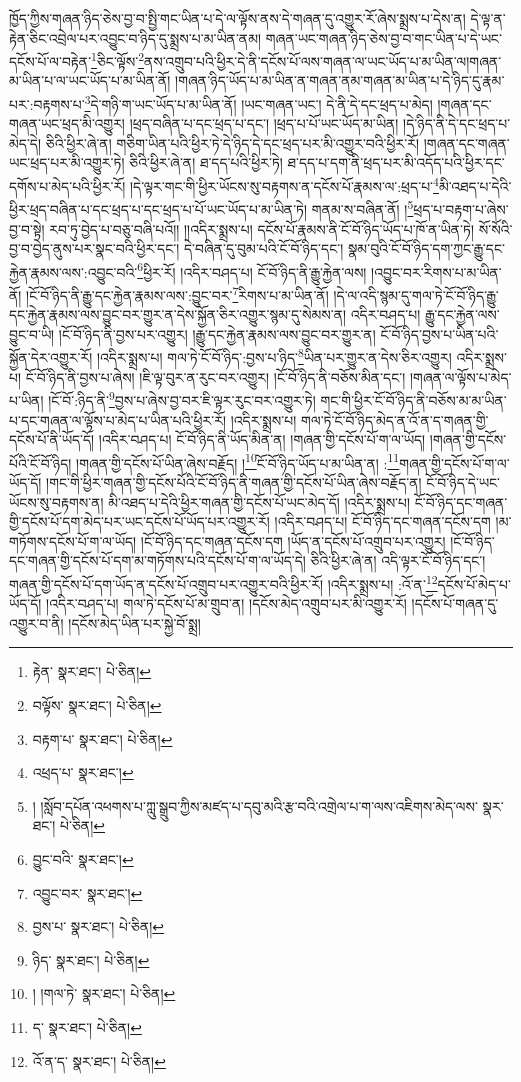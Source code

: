 ཁྱོད་ཀྱིས་གཞན་ཉིད་ཅེས་བྱ་བ་སྤྱི་གང་ཡིན་པ་དེ་ལ་ལྟོས་ནས་དེ་གཞན་དུ་འགྱུར་རོ་ཞེས་སྨྲས་པ་དེས་ན། དེ་ལྟ་ན་རྟེན་ཅིང་འབྲེལ་པར་འབྱུང་བ་ཉིད་དུ་སྨྲས་པ་མ་ཡིན་ནམ། གཞན་ཡང་གཞན་ཉིད་ཅེས་བྱ་བ་གང་ཡིན་པ་དེ་ཡང་དངོས་པོ་ལ་བརྟེན་\footnote{རྟེན་  སྣར་ཐང་།  པེ་ཅིན། }ཅིང་ལྟོས་\footnote{བལྟོས་  སྣར་ཐང་།  པེ་ཅིན། }ནས་འགྲུབ་པའི་ཕྱིར་དེ་ནི་དངོས་པོ་ལས་གཞན་ལ་ཡང་ཡོད་པ་མ་ཡིན་ལ།གཞན་མ་ཡིན་པ་ལ་ཡང་ཡོད་པ་མ་ཡིན་ནོ། །གཞན་ཉིད་ཡོད་པ་མ་ཡིན་ན་གཞན་ནམ་གཞན་མ་ཡིན་པ་དེ་ཉིད་དུ་རྣམ་པར་:བརྟགས་པ་\footnote{བརྟག་པ་  སྣར་ཐང་།  པེ་ཅིན། }དེ་གཉི་ག་ཡང་ཡོད་པ་མ་ཡིན་ནོ། །ཡང་གཞན་ཡང་། དེ་ནི་དེ་དང་ཕྲད་པ་མེད། །གཞན་དང་གཞན་ཡང་ཕྲད་མི་འགྱུར། །ཕྲད་བཞིན་པ་དང་ཕྲད་པ་དང་། །ཕྲད་པ་པོ་ཡང་ཡོད་མ་ཡིན། །དེ་ཉིད་ནི་དེ་དང་ཕྲད་པ་མེད་དེ། ཅིའི་ཕྱིར་ཞེ་ན། གཅིག་ཡིན་པའི་ཕྱིར་ཏེ་དེ་ཉིད་དེ་དང་ཕྲད་པར་མི་འགྱུར་བའི་ཕྱིར་རོ། །གཞན་དང་གཞན་ཡང་ཕྲད་པར་མི་འགྱུར་ཏེ། ཅིའི་ཕྱིར་ཞེ་ན། ཐ་དད་པའི་ཕྱིར་ཏེ། ཐ་དད་པ་དག་ནི་ཕྲད་པར་མི་འདོད་པའི་ཕྱིར་དང་དགོས་པ་མེད་པའི་ཕྱིར་རོ། །དེ་ལྟར་གང་གི་ཕྱིར་ཡོངས་སུ་བརྟགས་ན་དངོས་པོ་རྣམས་ལ་:ཕྲད་པ་\footnote{འཕྲད་པ་  སྣར་ཐང་། }མི་འཐད་པ་དེའི་ཕྱིར་ཕྲད་བཞིན་པ་དང་ཕྲད་པ་དང་ཕྲད་པ་པོ་ཡང་ཡོད་པ་མ་ཡིན་ཏེ། གནམ་ས་བཞིན་ནོ། །\footnote{། །སློབ་དཔོན་འཕགས་པ་ཀླུ་སྒྲུབ་ཀྱིས་མཛད་པ་དབུ་མའི་རྩ་བའི་འགྲེལ་པ་ག་ལས་འཇིགས་མེད་ལས་  སྣར་ཐང་།  པེ་ཅིན། }ཕྲད་པ་བརྟག་པ་ཞེས་བྱ་བ་སྟེ། རབ་ཏུ་བྱེད་པ་བཅུ་བཞི་པའོ།། །།འདིར་སྨྲས་པ། དངོས་པོ་རྣམས་ནི་ངོ་བོ་ཉིད་ཡོད་པ་ཁོ་ན་ཡིན་ཏེ། སོ་སོའི་བྱ་བ་བྱེད་ནུས་པར་སྣང་བའི་ཕྱིར་དང་། དེ་བཞིན་དུ་བུམ་པའི་ངོ་བོ་ཉིད་དང་། སྣམ་བུའི་ངོ་བོ་ཉིད་དག་ཀྱང་རྒྱུ་དང་རྐྱེན་རྣམས་ལས་:འབྱུང་བའི་\footnote{བྱུང་བའི་  སྣར་ཐང་། }ཕྱིར་རོ། །འདིར་བཤད་པ། ངོ་བོ་ཉིད་ནི་རྒྱུ་རྐྱེན་ལས། །འབྱུང་བར་རིགས་པ་མ་ཡིན་ནོ། །ངོ་བོ་ཉིད་ནི་རྒྱུ་དང་རྐྱེན་རྣམས་ལས་:བྱུང་བར་\footnote{འབྱུང་བར་  སྣར་ཐང་། }རིགས་པ་མ་ཡིན་ནོ། །དེ་ལ་འདི་སྙམ་དུ་གལ་ཏེ་ངོ་བོ་ཉིད་རྒྱུ་དང་རྐྱེན་རྣམས་ལས་བྱུང་བར་གྱུར་ན་དེས་སྐྱོན་ཅིར་འགྱུར་སྙམ་དུ་སེམས་ན། འདིར་བཤད་པ། རྒྱུ་དང་རྐྱེན་ལས་བྱུང་བ་ཡི། །ངོ་བོ་ཉིད་ནི་བྱས་པར་འགྱུར། །རྒྱུ་དང་རྐྱེན་རྣམས་ལས་བྱུང་བར་གྱུར་ན། ངོ་བོ་ཉིད་བྱས་པ་ཡིན་པའི་སྐྱོན་དེར་འགྱུར་རོ། །འདིར་སྨྲས་པ། གལ་ཏེ་ངོ་བོ་ཉིད་:བྱས་པ་ཉིད་\footnote{བྱས་པ་  སྣར་ཐང་།  པེ་ཅིན། }ཡིན་པར་གྱུར་ན་དེས་ཅིར་འགྱུར། འདིར་སྨྲས་པ། ངོ་བོ་ཉིད་ནི་བྱས་པ་ཞེས། །ཇི་ལྟ་བུར་ན་རུང་བར་འགྱུར། །ངོ་བོ་ཉིད་ནི་བཅོས་མིན་དང་། །གཞན་ལ་ལྟོས་པ་མེད་པ་ཡིན། །ངོ་བོ་:ཉིད་ནི་\footnote{ཉིད་  སྣར་ཐང་།  པེ་ཅིན། }བྱས་པ་ཞེས་བྱ་བར་ཇི་ལྟར་རུང་བར་འགྱུར་ཏེ། གང་གི་ཕྱིར་ངོ་བོ་ཉིད་ནི་བཅོས་མ་མ་ཡིན་པ་དང་གཞན་ལ་ལྟོས་པ་མེད་པ་ཡིན་པའི་ཕྱིར་རོ། །འདིར་སྨྲས་པ། གལ་ཏེ་ངོ་བོ་ཉིད་མེད་ན་འོ་ན་ད་གཞན་གྱི་དངོས་པོ་ནི་ཡོད་དོ། །འདིར་བཤད་པ། ངོ་བོ་ཉིད་ནི་ཡོད་མིན་ན། །གཞན་གྱི་དངོས་པོ་ག་ལ་ཡོད། །གཞན་གྱི་དངོས་པོའི་ངོ་བོ་ཉིད། །གཞན་གྱི་དངོས་པོ་ཡིན་ཞེས་བརྗོད། །\footnote{། །གལ་ཏེ་  སྣར་ཐང་།  པེ་ཅིན། }ངོ་བོ་ཉིད་ཡོད་པ་མ་ཡིན་ན། :\footnote{ད་  སྣར་ཐང་།  པེ་ཅིན། }གཞན་གྱི་དངོས་པོ་ག་ལ་ཡོད་དོ། །གང་གི་ཕྱིར་གཞན་གྱི་དངོས་པོའི་ངོ་བོ་ཉིད་ནི་གཞན་གྱི་དངོས་པོ་ཡིན་ཞེས་བརྗོད་ན། ངོ་བོ་ཉིད་དེ་ཡང་ཡོངས་སུ་བརྟགས་ན། མི་འཐད་པ་དེའི་ཕྱིར་གཞན་གྱི་དངོས་པོ་ཡང་མེད་དོ། །འདིར་སྨྲས་པ། ངོ་བོ་ཉིད་དང་གཞན་གྱི་དངོས་པོ་དག་མེད་པར་ཡང་དངོས་པོ་ཡོད་པར་འགྱུར་རོ། །འདིར་བཤད་པ། ངོ་བོ་ཉིད་དང་གཞན་དངོས་དག །མ་གཏོགས་དངོས་པོ་ག་ལ་ཡོད། །ངོ་བོ་ཉིད་དང་གཞན་དངོས་དག །ཡོད་ན་དངོས་པོ་འགྲུབ་པར་འགྱུར། །ངོ་བོ་ཉིད་དང་གཞན་གྱི་དངོས་པོ་དག་མ་གཏོགས་པའི་དངོས་པོ་ག་ལ་ཡོད་དེ། ཅིའི་ཕྱིར་ཞེ་ན། འདི་ལྟར་ངོ་བོ་ཉིད་དང་། གཞན་གྱི་དངོས་པོ་དག་ཡོད་ན་དངོས་པོ་འགྲུབ་པར་འགྱུར་བའི་ཕྱིར་རོ། །འདིར་སྨྲས་པ། :འོ་ན་\footnote{འོ་ན་ད་  སྣར་ཐང་།  པེ་ཅིན། }དངོས་པོ་མེད་པ་ཡོད་དོ། །འདིར་བཤད་པ། གལ་ཏེ་དངོས་པོ་མ་གྲུབ་ན། །དངོས་མེད་འགྲུབ་པར་མི་འགྱུར་རོ། །དངོས་པོ་གཞན་དུ་འགྱུར་བ་ནི། །དངོས་མེད་ཡིན་པར་སྐྱེ་བོ་སྨྲ། 